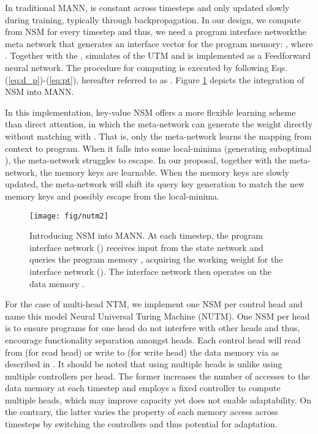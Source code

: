 \documentclass[english]{article}
\begin{document}
In traditional MANN,  is constant across timesteps and only
updated slowly during training, typically through backpropagation.
In our design, we compute  from NSM for every timestep
and thus, we need a program interface networkthe meta network
that generates an interface vector for
the program memory: ,
where . Together
with the ,  simulates 
of the UTM and is implemented as a Feedforward neural network. The
procedure for computing  is executed by following Eqs.
(\ref{eq:d_p})-(\ref{eq:pt}), hereafter referred to as .
Figure \ref{fig:NUTM-diagram} depicts the integration of NSM into
MANN.

In this implementation, key-value NSM offers a more flexible learning
scheme than direct attention, in which the meta-network can generate
the weight  directly without matching  with
. That is, only the meta-network
learns the mapping from context  to program. When it falls
into some local-minima (generating suboptimal ), the meta-network
struggles to escape. In our proposal, together with the meta-network,
the memory keys are learnable. When the memory keys are slowly updated,
the meta-network will shift its query key generation to match the
new memory keys and possibly escape from the local-minima. 

\begin{figure}
\begin{centering}
\texttt{[image: fig/nutm2]}
\par\end{centering}
\caption{Introducing NSM into MANN. At each timestep, the program interface
network () receives input from the state
network and queries the program memory , acquiring
the working weight for the interface network (). The interface
network then operates on the data memory . \label{fig:NUTM-diagram}}
\end{figure}
For the case of multi-head NTM, we implement one NSM per control head
and name this model Neural Universal Turing Machine (NUTM). One NSM
per head is to ensure programs for one head do not interfere with
other heads and thus, encourage functionality separation amongst heads.
Each control head will read from (for read head) or write to (for
write head) the data memory  via 
as described in \citet{graves2014neural} . It should be noted that
using multiple heads is unlike using multiple controllers per head.
The former increases the number of accesses to the data memory at
each timestep and employs a fixed controller to compute multiple heads,
which may improve capacity yet does not enable adaptability. On the
contrary, the latter varies the property of each memory access across
timesteps by switching the controllers and thus potential for adaptation. 
\end{document}
